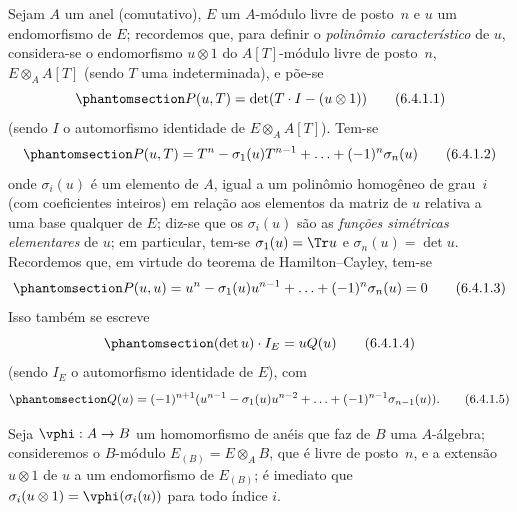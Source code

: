 \documentclass[oneside,10pt]{amsart}
\makeatletter
\newcommand{\ega@arrow}[2]{\mathchoice{#1}{#2}{#2}{#2}}
\renewcommand{\to}{\ega@arrow{\longrightarrow}{\rightarrow}}
\newcommand{\oldpage}[2][]{\marginnote{\normalfont\footnotesize\textbf{#1}~|~#2}\ignorespaces}
\let\EGAOriginalLabel\label
\renewcommand{\label}[1]{\phantomsection\EGAOriginalLabel{#1}}
\makeatother
\begin{document}
\begin{env}[6.4.1]
\label{II.6.4.1}
Sejam $A$ um anel (comutativo), $E$ um $A$-módulo livre de posto~$n$ e $u$ um endomorfismo de $E$;
recordemos que, para definir o \emph{polinômio característico} de $u$, considera-se o endomorfismo $u\otimes1$ do $A[T]$-módulo livre de posto~$n$, $E\otimes_A A[T]$ (sendo $T$ uma indeterminada), e põe-se
\[
\label{II.6.4.1.1}
  P(u,T) = \det(T\cdot I-(u\otimes 1))
\tag{6.4.1.1}
\]
(sendo $I$ o automorfismo identidade de $E\otimes_A A[T]$).
Tem-se
\[
\label{II.6.4.1.2}
  P(u,T) = T^n - \sigma_1(u)T^{n-1} + \ldots + (-1)^n\sigma_n(u)
\tag{6.4.1.2}
\]
onde $\sigma_i(u)$ é um elemento de $A$, igual a um polinômio homogêneo de grau~$i$ (com coeficientes inteiros) em relação aos elementos da matriz de $u$ relativa a uma base qualquer de $E$;
diz-se que os $\sigma_i(u)$ são as \emph{funções simétricas elementares} de $u$;
em particular, tem-se $\sigma_1(u)=\Tr u$ e $\sigma_n(u)=\det u$.
Recordemos que, em virtude do teorema de Hamilton--Cayley, tem-se
\[
\label{II.6.4.1.3}
  P(u,u) = u^n - \sigma_1(u)u^{n-1} + \ldots + (-1)^n\sigma_n(u) = 0
\tag{6.4.1.3}
\]
\oldpage[II]{121}
Isso também se escreve
\[
\label{II.6.4.1.4}
  (\det u)\cdot I_E = uQ(u)
\tag{6.4.1.4}
\]
(sendo $I_E$ o automorfismo identidade de $E$), com
\[
\label{II.6.4.1.5}
  Q(u) = (-1)^{n+1}(u^{n-1}-\sigma_1(u)u^{n-2}+\ldots+(-1)^{n-1}\sigma_{n-1}(u)).
\tag{6.4.1.5}
\]

Seja $\vphi:A\to B$ um homomorfismo de anéis que faz de $B$ uma $A$-álgebra;
consideremos o $B$-módulo $E_{(B)}=E\otimes_A B$, que é livre de posto~$n$, e a extensão $u\otimes1$ de $u$ a um endomorfismo de $E_{(B)}$;
é imediato que $\sigma_i(u\otimes1)=\vphi(\sigma_i(u))$ para todo índice $i$.
\end{env}
\end{document}
